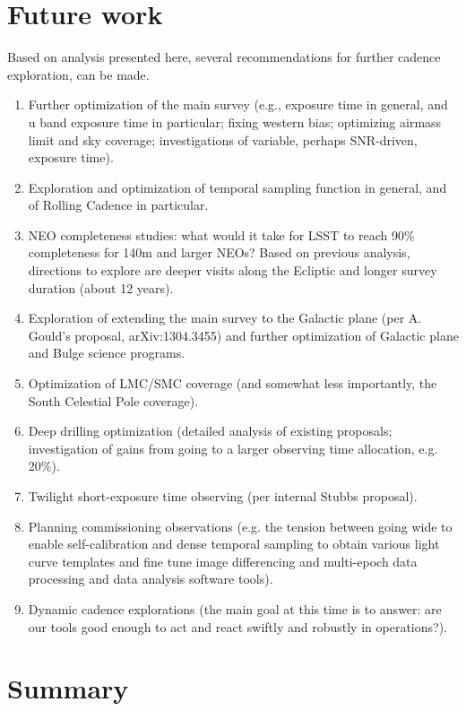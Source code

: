 \documentclass[manuscript]{article}
\begin{document}
\newpage
\section{Future work} 

Based on analysis presented here, several recommendations 
for further cadence exploration, can be made. 

\begin{enumerate} 
\item Further optimization of the main survey (e.g., exposure time in general, and 
 u band exposure time in particular; fixing western bias; optimizing airmass limit
 and sky coverage; investigations of variable, perhaps SNR-driven, exposure time). 
\item Exploration and optimization of temporal sampling function in general, and of
      Rolling Cadence in particular. 
\item NEO completeness studies: what would it take for LSST to reach 
    90\% completeness for 140m and larger NEOs?  Based on previous analysis, 
    directions to explore are deeper visits along the Ecliptic and longer survey
    duration (about 12 years).
\item Exploration of extending the main survey to the Galactic plane (per A. Gould's proposal, 
     arXiv:1304.3455) and further optimization of Galactic plane and Bulge science programs. 
\item Optimization of LMC/SMC coverage (and somewhat less importantly, the South Celestial 
         Pole coverage).
\item Deep drilling optimization (detailed analysis of existing proposals; investigation
of gains from going to a larger observing time allocation, e.g. 20\%). 
\item Twilight short-exposure time observing (per internal Stubbs proposal).
\item Planning commissioning observations (e.g. the tension between going wide 
      to enable self-calibration and dense temporal sampling to obtain various
      light curve templates and fine tune image differencing and multi-epoch data
      processing and data analysis software tools). 
\item Dynamic cadence explorations (the main goal at this time is to answer:   
        are our tools good enough to act and react swiftly and robustly in operations?). 
\end{enumerate} 


\newpage
\section{Summary \label{sec:summary}}
\end{document}
